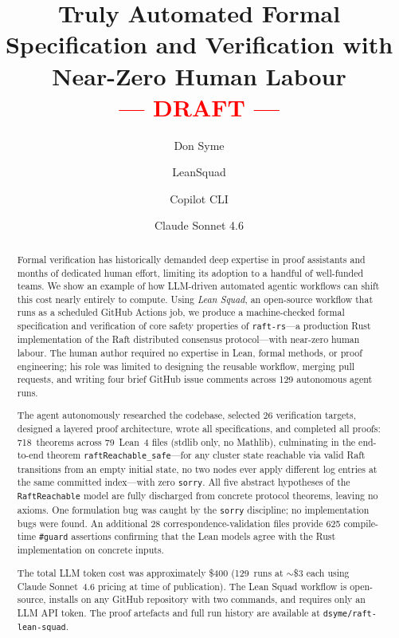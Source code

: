 \documentclass[sigconf,10pt]{acmart}
\begin{document}
\title{Truly Automated Formal Specification and Verification with Near-Zero Human Labour\\\normalsize\textcolor{red}{--- DRAFT ---}}

\author{Don Syme}

\author{LeanSquad}

\author{Copilot CLI}

\author{Claude Sonnet 4.6}
\email{}

\begin{abstract}
Formal verification has historically demanded deep expertise in proof
assistants and months of dedicated human effort, limiting its adoption to
a handful of well-funded teams.  We show an example of how LLM-driven automated agentic
workflows can shift this cost nearly entirely to compute.  Using \emph{Lean
Squad}, an open-source workflow that runs as a scheduled GitHub Actions
job, we produce a machine-checked formal specification and verification of core safety
properties of \texttt{raft-rs}---a production Rust implementation of the
Raft distributed consensus protocol---with near-zero human labour.  The
human author required no expertise in Lean, formal methods, or proof
engineering; his role was limited to designing the reusable workflow,
merging pull requests, and writing four brief GitHub issue comments across 129
autonomous agent runs.

The agent autonomously researched the codebase, selected 26 verification
targets, designed a layered proof architecture, wrote all specifications, and completed all proofs:
718~theorems across 79~Lean~4 files (stdlib only, no Mathlib),
culminating in the end-to-end theorem \texttt{raftReachable\_safe}---for
any cluster state reachable via valid Raft transitions from an empty
initial state, no two nodes ever apply different log entries at the same
committed index---with zero \texttt{sorry}.
All five abstract hypotheses of the \texttt{RaftReachable} model are
fully discharged from concrete protocol theorems, leaving no axioms.
One formulation bug was caught by the \texttt{sorry} discipline;
no implementation bugs were found.
An additional 28 correspondence-validation files provide 625
compile-time \texttt{\#guard} assertions confirming that the Lean models
agree with the Rust implementation on concrete inputs.

The total LLM token cost was approximately \$400 (129~runs at
$\sim$\$3 each using Claude Sonnet~4.6 pricing at time of publication).
The Lean Squad workflow is open-source, installs on any GitHub repository
with two commands, and requires only an LLM API token.  The proof
artefacts and full run history are available at
\texttt{dsyme/raft-lean-squad}.
\end{abstract}
\end{document}
